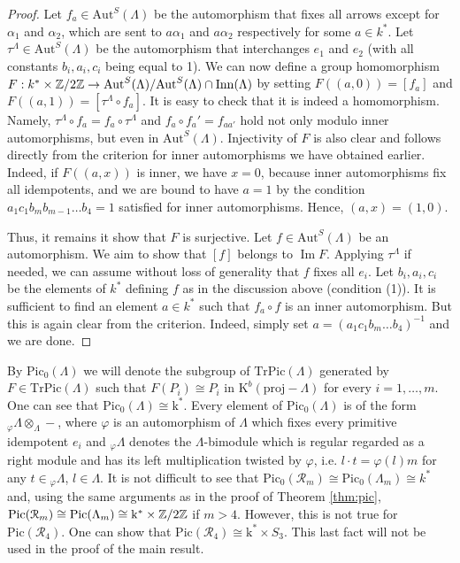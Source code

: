 \documentclass[12pt]{amsart}
\theoremstyle{plain}
\theoremstyle{remark}
\theoremstyle{definition}
\newcommand{\proj}{{\mathrm{proj}}}
\newcommand{\Aut}{{\mathrm{Aut}}}
\newcommand{\Inn}{\mathop{\mathrm{Inn}}\nolimits}
\newcommand{\Pic}{{\mathrm{Pic}}}
\newcommand{\TrPic}{{\mathrm{TrPic}}}
\newcommand{\Imm}{\mathop{\mathrm{Im}}\nolimits}
\newcommand{\K}{{\mathrm{K}}}
\def\kk{\mathrm{k}}
\begin{document}
\begin{proof}
Let $f_a \in \Aut^S(\Lambda)$ be the automorphism that fixes all arrows except for $\alpha_1$ and $\alpha_2$, which are sent to $a \alpha_1$ and $a \alpha_2$ respectively for some $a \in k^*$. Let $\tau^{\Lambda} \in \Aut^S(\Lambda)$ be the automorphism that interchanges $e_1$ and $e_2$ (with all constants $b_i, a_i, c_i$ being equal to 1). We can now define a group homomorphism $F: k^* \times \Z/2\Z \to \Aut^S(\Lambda)/\Aut^S(\Lambda)\cap \Inn(\Lambda)$ by setting ${F((a,0)) = [f_a]}$ and ${F((a,1)) = [\tau^{\Lambda} \circ f_a]}$. It is easy to check that it is indeed a homomorphism. Namely, $\tau^{\Lambda} \circ f_a = f_a \circ \tau^{\Lambda}$ and $f_a \circ f_a' = f_{aa'}$ hold not only modulo inner automorphisms, but even in $\Aut^S(\Lambda)$. Injectivity of $F$ is also clear and follows directly from the criterion for inner automorphisms we have obtained earlier. Indeed, if $F((a,x))$ is inner, we have $x = 0$, because inner automorphisms fix all idempotents, and we are bound to have $a = 1$ by the condition $a_1c_1b_mb_{m-1}\dots b_4 = 1$ satisfied for inner automorphisms. Hence, $(a,x) = (1,0)$. 


Thus, it remains it show that $F$ is surjective. Let $f \in \Aut^S(\Lambda)$ be an automorphism. We aim to show that $[f]$ belongs to $\Imm F$. Applying $\tau^{\Lambda}$ if needed, we can assume without loss of generality that $f$ fixes all $e_i$. Let $b_i, a_i, c_i$ be the elements of $k^*$ defining $f$ as in the discussion above (condition (1)). It is sufficient to find an element $a\in k^*$ such that $f_a \circ f$ is an inner automorphism. But this is again clear from the criterion. Indeed, simply set $a = (a_1c_1b_m \dots b_4)^{-1}$ and we are done.
  \end{proof} 

By $\Pic_0(\Lambda)$ we will denote the subgroup of $\TrPic(\Lambda)$ generated by $F \in \TrPic(\Lambda)$ such that $F(P_i) \cong P_i$ in $\K^b(\proj-\Lambda)$ for every $i=1, \dots, m$. One can see that $\Pic_0(\Lambda) \cong \kk^*$. Every element of $\Pic_0(\Lambda)$ is of the form $ _{\varphi}\Lambda \otimes_{\Lambda} -$, where $\varphi$ is an automorphism of $\Lambda$ which fixes every primitive idempotent $e_i$ and $_{\varphi}\Lambda$ denotes the $\Lambda$-bimodule which is regular regarded as a right module and has its left multiplication twisted by $\varphi$, i.e. $l \cdot t = \varphi(l)m$ for any $t \in {}_\varphi \Lambda$, $l \in \Lambda$. 
It is not difficult to see that $\Pic_0(\mathcal{R}_m) \cong \Pic_0(\Lambda_m) \cong k^*$ and, using the same arguments as in the proof of Theorem \ref{thm:pic}, $\Pic(\mathcal{R}_m) \cong \Pic(\Lambda_m) \cong \kk^* \times \Z/2\Z$ if $m>4$. However, this is not true for $\Pic(\mathcal{R}_4)$. One can show that $\Pic(\mathcal{R}_4) \cong \kk^* \times S_3$. This last fact will not be used in the proof of the main result. 
\end{document}
